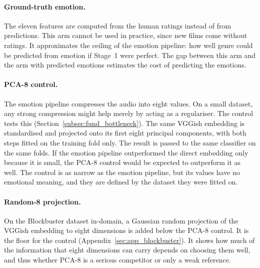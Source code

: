\paragraph{Ground-truth emotion.} The eleven features are computed from the human ratings instead of from predictions. This arm cannot be used in practice, since new films come without ratings. It approximates the ceiling of the emotion pipeline: how well genre could be predicted from emotion if Stage~1 were perfect. The gap between this arm and the arm with predicted emotions estimates the cost of predicting the emotions.

\paragraph{PCA-8 control.} The emotion pipeline compresses the audio into eight values. On a small dataset, any strong compression might help merely by acting as a regulariser. The control tests this (Section~\ref{subsec:fund_bottleneck}). The same VGGish embedding is standardised and projected onto its first eight principal components, with both steps fitted on the training fold only. The result is passed to the same classifier on the same folds. If the emotion pipeline outperformed the direct embedding only because it is small, the PCA-8 control would be expected to outperform it as well. The control is as narrow as the emotion pipeline, but its values have no emotional meaning, and they are defined by the dataset they were fitted on.

\paragraph{Random-8 projection.} On the Blockbuster dataset in-domain, a Gaussian random projection of the VGGish embedding to eight dimensions is added below the PCA-8 control. It is the floor for the control (Appendix~\ref{sec:app_blockbuster}). It shows how much of the information that eight dimensions can carry depends on choosing them well, and thus whether PCA-8 is a serious competitor or only a weak reference.

